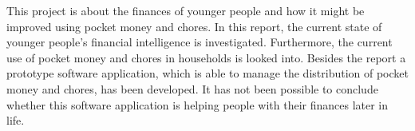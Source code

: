 This project is about the finances of younger people and how it might be improved using pocket money and chores. In this report, the current state of younger people's financial intelligence is investigated. Furthermore, the current use of pocket money and chores in households is looked into. Besides the report a prototype software application, which is able to manage the distribution of pocket money and chores, has been developed. It has not been possible to conclude whether this software application is helping people with their finances later in life.